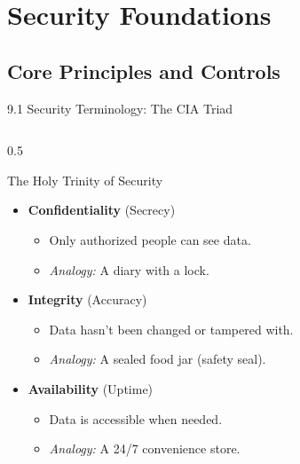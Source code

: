 \documentclass[aspectratio=169]{beamer}  %
\begin{document}
\section{Security Foundations}
\subsection{Core Principles and Controls}


\begin{frame}{9.1 Security Terminology: The CIA Triad}
    \begin{columns}[T]
        \begin{column}{0.5\textwidth}
            \begin{block}{The Holy Trinity of Security}
                \footnotesize
                \begin{itemize}\setlength{\itemsep}{2pt}
                    \item \textbf{Confidentiality} (Secrecy)
                    \begin{itemize}\setlength{\itemsep}{0pt}
                        \item Only authorized people can see data.
                        \item \textit{Analogy:} A diary with a lock.
                    \end{itemize}
                    \item \textbf{Integrity} (Accuracy)
                    \begin{itemize}\setlength{\itemsep}{0pt}
                        \item Data hasn't been changed or tampered with.
                        \item \textit{Analogy:} A sealed food jar (safety seal).
                    \end{itemize}
                    \item \textbf{Availability} (Uptime)
                    \begin{itemize}\setlength{\itemsep}{0pt}
                        \item Data is accessible when needed.
                        \item \textit{Analogy:} A 24/7 convenience store.
                    \end{itemize}

\end{itemize}
\end{block}
\end{column}
\end{columns}
\end{frame}
\end{document}

